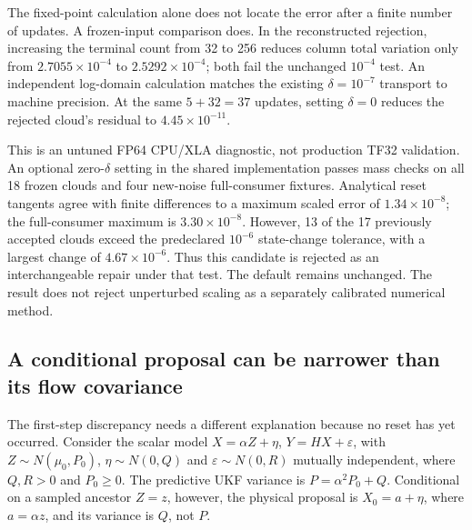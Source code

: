 The fixed-point calculation alone does not locate the error after a finite
number of updates. A frozen-input comparison does. In the reconstructed
rejection, increasing the terminal count from 32 to 256 reduces column
total variation only from $2.7055\times10^{-4}$ to $2.5292\times10^{-4}$;
both fail the unchanged $10^{-4}$ test. An independent log-domain calculation
matches the existing $\delta=10^{-7}$ transport to machine precision.
At the same $5+32=37$ updates, setting $\delta=0$ reduces the rejected
cloud's residual to $4.45\times10^{-11}$.

This is an untuned FP64 CPU/XLA diagnostic, not production TF32 validation.
An optional zero-$\delta$ setting in the shared implementation passes mass
checks on all 18 frozen clouds and four new-noise full-consumer fixtures.
Analytical reset tangents agree with finite differences to a maximum scaled
error of $1.34\times10^{-8}$; the full-consumer maximum is
$3.30\times10^{-8}$. However, 13 of the 17 previously accepted clouds exceed
the predeclared $10^{-6}$ state-change tolerance, with a largest change of
$4.67\times10^{-6}$. Thus this candidate is rejected as an interchangeable
repair under that test. The default remains unchanged. The result does not
reject unperturbed scaling as a separately calibrated numerical method.

\subsection{A conditional proposal can be narrower than its flow covariance}

The first-step discrepancy needs a different explanation because no reset has
yet occurred. Consider the scalar model $X=\alpha Z+\eta$,
$Y=HX+\varepsilon$, with $Z\sim N(\mu_0,P_0)$, $\eta\sim N(0,Q)$ and
$\varepsilon\sim N(0,R)$ mutually independent, where $Q,R>0$ and
$P_0\geq0$. The predictive UKF variance
is $P=\alpha^2P_0+Q$. Conditional on a sampled ancestor $Z=z$, however,
the physical proposal is $X_0=a+\eta$, where $a=\alpha z$, and its variance
is $Q$, not $P$.

